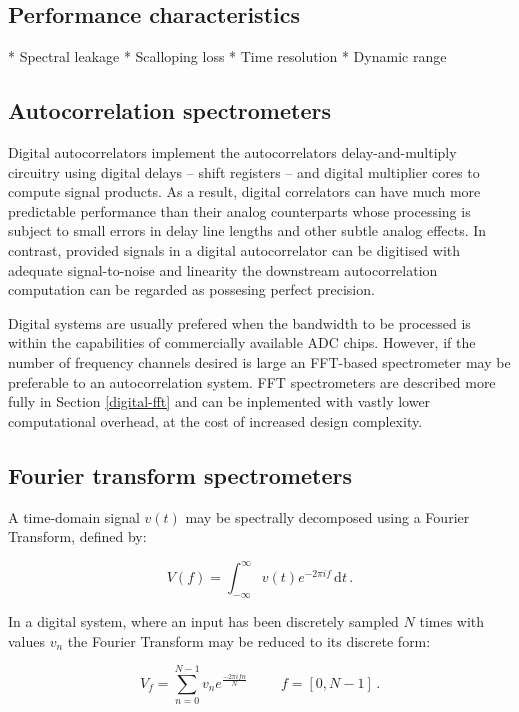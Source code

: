\documentclass{ws-rv961x669}
\begin{document}
\subsection{Performance characteristics}

* Spectral leakage
* Scalloping loss
* Time resolution
* Dynamic range

\subsection{Autocorrelation spectrometers}

Digital autocorrelators implement the autocorrelators delay-and-multiply circuitry using digital delays -- shift registers -- and digital multiplier cores to compute signal products. As a result, digital correlators can have much more predictable performance than their analog counterparts whose processing is subject to small errors in delay line lengths and other subtle analog effects. In contrast, provided signals in a digital autocorrelator can be digitised with adequate signal-to-noise and linearity the downstream autocorrelation computation can be regarded as possesing perfect precision.

Digital systems are usually prefered when the bandwidth to be processed is within the capabilities of commercially available ADC chips. However, if the number of frequency channels desired is large an FFT-based spectrometer may be preferable to an autocorrelation system. FFT spectrometers are described more fully in Section \ref{digital-fft} and can be inplemented with vastly lower computational overhead, at the cost of increased design complexity.

\subsection{Fourier transform spectrometers}

A time-domain signal $v(t)$ may be spectrally decomposed using a Fourier Transform, defined by:

\begin{equation}
 \label{ft}
 V(f) = \int_{-\infty}^{\infty} v(t) e^{-2\pi i f} \,\mathrm{d}t\, .
\end{equation}

In a digital system, where an input has been discretely sampled $N$ times with values $v_n$ the Fourier Transform may be reduced to its discrete form: 

\begin{equation}
 \label{dft}
 V_f = \sum_{n = 0}^{N-1} v_n e^{\frac{-2\pi i f n}{N}} \hspace{1cm} f = [0, N-1]\,.
\end{equation}
\end{document}
